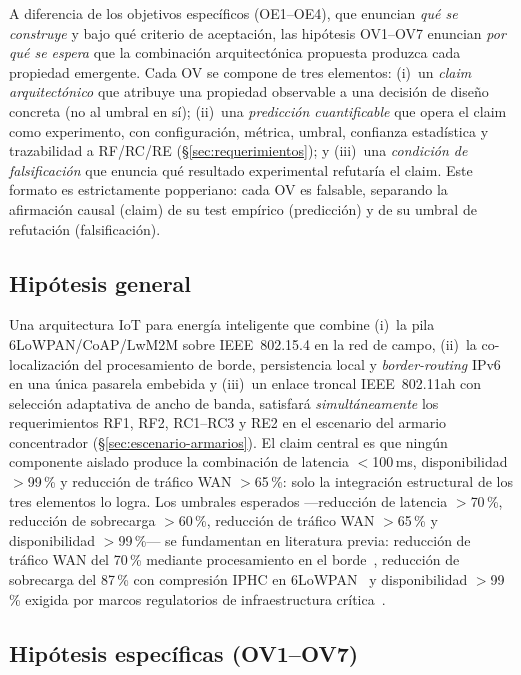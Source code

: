 A diferencia de los objetivos específicos (OE1--OE4), que enuncian \emph{qué se construye} y bajo qué criterio de aceptación, las hipótesis OV1--OV7 enuncian \emph{por qué se espera} que la combinación arquitectónica propuesta produzca cada propiedad emergente. Cada OV se compone de tres elementos: (i)~un \emph{claim arquitectónico} que atribuye una propiedad observable a una decisión de diseño concreta (no al umbral en sí); (ii)~una \emph{predicción cuantificable} que opera el claim como experimento, con configuración, métrica, umbral, confianza estadística y trazabilidad a RF/RC/RE (§\ref{sec:requerimientos}); y (iii)~una \emph{condición de falsificación} que enuncia qué resultado experimental refutaría el claim. Este formato es estrictamente popperiano: cada OV es falsable, separando la afirmación causal (claim) de su test empírico (predicción) y de su umbral de refutación (falsificación).

\subsection{Hipótesis general}

Una arquitectura IoT para energía inteligente que combine (i)~la pila 6LoWPAN/CoAP/LwM2M sobre IEEE~802.15.4 en la red de campo, (ii)~la co-localización del procesamiento de borde, persistencia local y \emph{border-routing} IPv6 en una única pasarela embebida y (iii)~un enlace troncal IEEE~802.11ah con selección adaptativa de ancho de banda, satisfará \emph{simultáneamente} los requerimientos RF1, RF2, RC1--RC3 y RE2 en el escenario del armario concentrador (§\ref{sec:escenario-armarios}). El claim central es que ningún componente aislado produce la combinación de latencia $<$100\,ms, disponibilidad $>$99\,\% y reducción de tráfico WAN $>$65\,\%: solo la integración estructural de los tres elementos lo logra. Los umbrales esperados ---reducción de latencia $>$70\,\%, reducción de sobrecarga $>$60\,\%, reducción de tráfico WAN $>$65\,\% y disponibilidad $>$99\,\%--- se fundamentan en literatura previa: reducción de tráfico WAN del 70\,\% mediante procesamiento en el borde~\cite{jonnakutiEDGEBASEDFAULTDETECTION}, reducción de sobrecarga del 87\,\% con compresión IPHC en 6LoWPAN~\cite{alharbi6LoWPANBasedAMI2021} y disponibilidad $>$99\,\% exigida por marcos regulatorios de infraestructura crítica~\cite{NISTFramework2022}.

\subsection{Hipótesis específicas (OV1--OV7)}
\label{sec:hipotesis-especificas}

